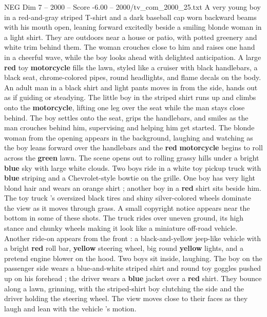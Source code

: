 \begin{textsample}{NEG Dim 7 – 2000 – Score -6.00 – 2000/tv\_com\_2000\_25.txt}  \label{ex:f7_neg_022}
A very young boy in a red-and-gray striped T-shirt and a dark baseball cap worn backward beams with his mouth open, leaning forward excitedly beside a smiling blonde woman in a light shirt.
They are outdoors near a house or patio, with potted greenery and white trim behind them.
The woman crouches close to him and raises one hand in a cheerful wave, while the boy looks ahead with delighted anticipation.
A large \textbf{red} toy \textbf{motorcycle} fills the lawn, styled like a cruiser with black handlebars, a black seat, chrome-colored pipes, round headlights, and flame decals on the body.
An adult man in a black shirt and light pants moves in from the side, hands out as if guiding or steadying.
The little boy in the striped shirt runs up and climbs onto the \textbf{motorcycle}, lifting one leg over the seat while the man stays close behind.
The boy settles onto the seat, grips the handlebars, and smiles as the man crouches behind him, supervising and helping him get started.
The blonde woman from the opening appears in the background, laughing and watching as the boy leans forward over the handlebars and the \textbf{red} \textbf{motorcycle} begins to roll across the \textbf{green} lawn.
The scene opens out to rolling grassy hills under a bright \textbf{blue} sky with large white clouds.
Two boys ride in a white toy pickup truck with \textbf{blue} striping and a Chevrolet-style bowtie on the grille.
One boy has very light blond hair and wears an orange shirt ; another boy in a \textbf{red} shirt sits beside him.
The toy truck ’s oversized black tires and shiny silver-colored wheels dominate the view as it moves through grass.
A small copyright notice appears near the bottom in some of these shots.
The truck rides over uneven ground, its high stance and chunky wheels making it look like a miniature off-road vehicle.
Another ride-on appears from the front : a black-and-yellow jeep-like vehicle with a bright \textbf{red} roll bar, \textbf{yellow} steering wheel, big round \textbf{yellow} lights, and a pretend engine blower on the hood.
Two boys sit inside, laughing.
The boy on the passenger side wears a blue-and-white striped shirt and round toy goggles pushed up on his forehead ; the driver wears a \textbf{blue} jacket over a \textbf{red} shirt.
They bounce along a lawn, grinning, with the striped-shirt boy clutching the side and the driver holding the steering wheel.
The view moves close to their faces as they laugh and lean with the vehicle ’s motion.

\end{textsample}
